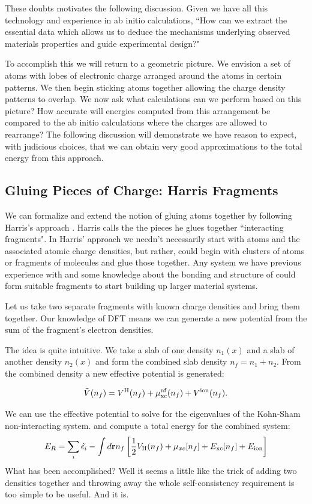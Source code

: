 These doubts motivates the following discussion. Given we have all this
technology and experience in ab initio calculations, ``How can we extract 
the essential data which allows us to deduce the mechanisms underlying
observed materials properties and guide experimental design?"

To accomplish this we will return to a geometric picture. We envision
a set of atoms with lobes of electronic charge arranged around the atoms in certain patterns.
We then begin sticking atoms together allowing the charge density patterns to overlap.
We now ask what calculations can we perform based on this picture? How accurate will
energies computed from this arrangement be compared 
to the ab initio calculations where the charges are allowed to rearrange? The following
discussion will demonstrate we have reason to expect, with judicious choices, that we can obtain
very good approximations to the total energy from this approach.

\subsection{Gluing Pieces of Charge: Harris Fragments}
We can formalize and extend the notion of gluing atoms together by following 
Harris's approach \cite{harris85}. Harris calls the the pieces he glues together 
``interacting fragments". In Harris' approach we needn't necessarily start with atoms and the associated
atomic charge densities, but rather, could begin with clusters of atoms or fragments of molecules 
and glue those together. Any system we have previous experience with and some knowledge about the bonding
and structure of could form suitable fragments to start building up larger material systems.

Let us take two separate fragments with known charge densities and bring them together. 
Our knowledge of DFT means we can generate a new potential from the sum of the 
fragment's electron densities. 

The idea is quite intuitive. We take a slab of one density $n_{1}(x)$ 
and a slab of another density $n_{2}(x)$ and form the combined slab density 
$n_{f}= n_{1} + n_{2}$. From the combined density a new effective potential
is generated:

\begin{equation}
\tilde{V}(n_{f}) = V^{\rm H}(n_{f}) + \mu^{\rm nf}_{\rm xc}(n_f) + V^{\rm ion}(n_f).
\end{equation}

We can use the effective potential to solve for the 
eigenvalues of the Kohn-Sham non-interacting system.
and compute a total energy for the combined system:
%
\begin{equation}
	E_{R} = \sum_{i}\tilde{\epsilon_{i}} - \int d{\bf r} n_{f} \left[\frac{1}{2}V_{\rm H}(n_{f})+\mu_{xc}[n_{f}]+E_{\rm xc}[n_f]+E_{\rm ion}\right]
\end{equation}
%
What has been accomplished? Well it seems a little like the trick of adding
two densities together and throwing away the whole self-consistency requirement 
is too simple to be useful. And it is. 


